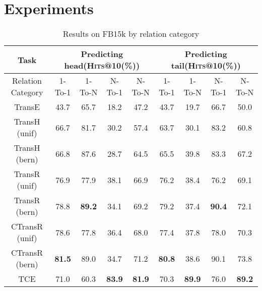 \section{Experiments}
\begin{table*} %
  \centering
  \caption{Results on FB15k by relation category}
  \label{table_results_by_relation_category}
  \begin{tabular}{c|cccc|cccc}
    \hline
    Task               & \multicolumn{4}{c|}{Predicting head(\textsc{Hits}@10(\%))} & \multicolumn{4}{c}{Predicting tail(\textsc{Hits}@10(\%))} \\
    \hline
    Relation Category  & 1-To-1        & 1-To-N        & N-To-1        & N-To-N        & 1-To-1        & 1-To-N        & N-To-1        & N-To-N \\
    \hline
    TransE             & 43.7          & 65.7          & 18.2          & 47.2          & 43.7          & 19.7          & 66.7          & 50.0   \\
    TransH (unif)      & 66.7          & 81.7          & 30.2          & 57.4          & 63.7          & 30.1          & 83.2          & 60.8   \\
    TransH (bern)      & 66.8          & 87.6          & 28.7          & 64.5          & 65.5          & 39.8          & 83.3          & 67.2   \\
    TransR (unif)      & 76.9          & 77.9          & 38.1          & 66.9          & 76.2          & 38.4          & 76.2          & 69.1   \\
    TransR (bern)      & 78.8          & \textbf{89.2} & 34.1          & 69.2          & 79.2          & 37.4          & \textbf{90.4} & 72.1   \\
    CTransR (unif)     & 78.6          & 77.8          & 36.4          & 68.0          & 77.4          & 37.8          & 78.0          & 70.3   \\
    CTransR (bern)     & \textbf{81.5} & 89.0          & 34.7          & 71.2          & \textbf{80.8} & 38.6          & 90.1          & 73.8   \\
    \hline
    TCE                & 71.0          & 60.3          & \textbf{83.9} & \textbf{81.9} & 70.3          & \textbf{89.9} & 76.0          & \textbf{89.2}   \\
    \hline
\end{tabular}
\end{table*}


